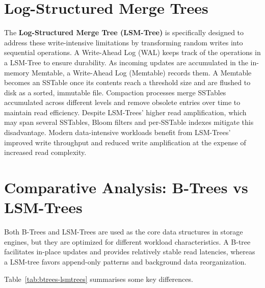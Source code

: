 \documentclass{mnitjaipur}
\begin{document}
\section{Log-Structured Merge Trees}

The \textbf{Log-Structured Merge Tree (LSM-Tree)} is specifically designed to address these write-intensive limitations by transforming random writes into sequential operations. A Write-Ahead Log (WAL) keeps track of the operations in a LSM-Tree to ensure durability. As incoming updates are accumulated in the in-memory Memtable, a Write-Ahead Log (Memtable) records them. A Memtable becomes an SSTable once its contents reach a threshold size and are flushed to disk as a sorted, immutable file. Compaction processes merge SSTables accumulated across different levels and remove obsolete entries over time to maintain read efficiency. Despite LSM-Trees' higher read amplification, which may span several SSTables, Bloom filters and per-SSTable indexes mitigate this disadvantage. Modern data-intensive workloads benefit from LSM-Trees' improved write throughput and reduced write amplification at the expense of increased read complexity.


\section{Comparative Analysis: B-Trees vs LSM-Trees}
Both B-Trees and LSM-Trees are used as the core data structures in storage engines, but they are optimized for different workload characteristics. A B-tree facilitates in-place updates and provides relatively stable read latencies, whereas a LSM-tree favors append-only patterns and background data reorganization.

Table~\ref{tab:btrees-lsmtrees} summarises some key differences.
\end{document}
